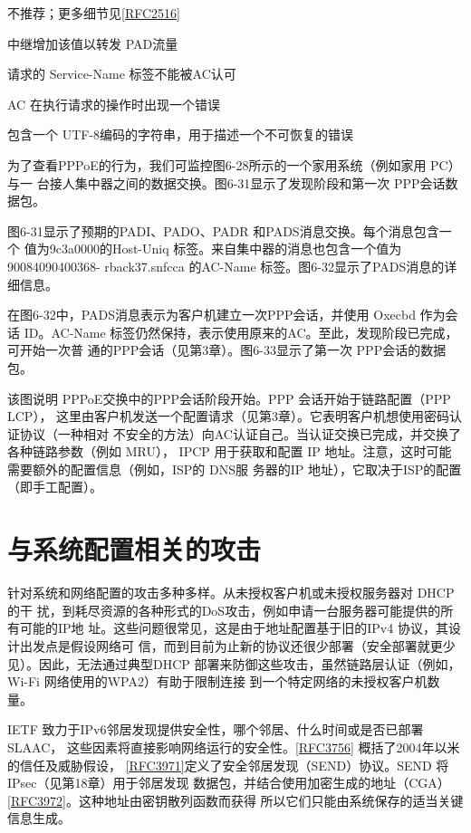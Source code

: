 不推荐；更多细节见\href{https://www.rfc-editor.org/rfc/rfc2516}{\href{https://www.rfc-editor.org/rfc/rfc2516}{[RFC2516]}}

中继增加该值以转发 PAD流量

请求的 Service-Name 标签不能被AC认可

AC 在执行请求的操作时出现一个错误

包含一个 UTF-8编码的字符串，用于描述一个不可恢复的错误

为了查看PPPoE的行为，我们可监控图6-28所示的一个家用系统（例如家用 PC）与一
台接人集中器之间的数据交换。图6-31显示了发现阶段和第一次 PPP会话数据包。

图6-31显示了预期的PADI、PADO、PADR 和PADS消息交换。每个消息包含一个
值为9c3a0000的Host-Uniq 标签。来自集中器的消息也包含一个值为90084090400368-
rback37.snfcca 的AC-Name 标签。图6-32显示了PADS消息的详细信息。

在图6-32中，PADS消息表示为客户机建立一次PPP会话，并使用 Oxecbd 作为会话
ID。AC-Name 标签仍然保持，表示使用原来的AC。至此，发现阶段已完成，可开始一次普
通的PPP会话（见第3章）。图6-33显示了第一次 PPP会话的数据包。

该图说明 PPPoE交换中的PPP会话阶段开始。PPP 会话开始于链路配置（PPP LCP），
这里由客户机发送一个配置请求（见第3章）。它表明客户机想使用密码认证协议（一种相对
不安全的方法）向AC认证自己。当认证交换已完成，并交换了各种链路参数（例如 MRU），
IPCP 用于获取和配置 IP 地址。注意，这时可能需要额外的配置信息（例如，ISP的 DNS服
务器的IP 地址），它取决于ISP的配置（即手工配置）。

\section{与系统配置相关的攻击}

针对系统和网络配置的攻击多种多样。从未授权客户机或未授权服务器对 DHCP 的干
扰，到耗尽资源的各种形式的DoS攻击，例如申请一台服务器可能提供的所有可能的IP地
址。这些问题很常见，这是由于地址配置基于旧的IPv4 协议，其设计出发点是假设网络可
信，而到目前为止新的协议还很少部署（安全部署就更少见）。因此，无法通过典型DHCP
部署来防御这些攻击，虽然链路层认证（例如，Wi-Fi 网络使用的WPA2）有助于限制连接
到一个特定网络的未授权客户机数量。

IETF 致力于IPv6邻居发现提供安全性，哪个邻居、什么时间或是否已部署SLAAC，
这些因素将直接影响网络运行的安全性。\href{https://www.rfc-editor.org/rfc/rfc3756}{\href{https://www.rfc-editor.org/rfc/rfc3756}{[RFC3756]}} 概括了2004年以米的信任及威胁假设，
\href{https://www.rfc-editor.org/rfc/rfc3971}{\href{https://www.rfc-editor.org/rfc/rfc3971}{[RFC3971]}}定义了安全邻居发现（SEND）协议。SEND 将 IPsec（见第18章）用于邻居发现
数据包，并结合使用加密生成的地址（CGA）\href{https://www.rfc-editor.org/rfc/rfc3972}{\href{https://www.rfc-editor.org/rfc/rfc3972}{[RFC3972]}}。这种地址由密钥散列函数而获得
所以它们只能由系统保存的适当关键信息生成。

